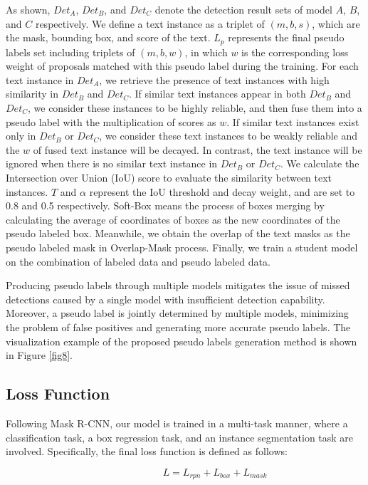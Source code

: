 As shown, $Det_{A}$, $Det_{B}$, and $Det_{C}$ denote the detection result sets of model $A$, $B$, and $C$ respectively. We define a text instance as a triplet of $(m,b,s)$, which are the mask, bounding box, and score of the text. $L_{p}$ represents the final pseudo labels set including triplets of $(m,b,w)$, in which $w$ is the corresponding loss weight of proposals matched with this pseudo label during the training. For each text instance in $Det_{A}$, we retrieve the presence of text instances with high similarity in $Det_{B}$ and $Det_{C}$. If similar text instances appear in both $Det_{B}$ and $Det_{C}$, we consider these instances to be highly reliable, and then fuse them into a pseudo label with the multiplication of scores as $w$. If similar text instances exist only in $Det_{B}$ or $Det_{C}$, we consider these text instances to be weakly reliable and the $w$ of fused text instance will be decayed. In contrast, the text instance will be ignored when there is no similar text instance in $Det_{B}$ or $Det_{C}$. We calculate the Intersection over Union (IoU) score to evaluate the similarity between text instances. $T$ and $\alpha$ represent the IoU threshold and decay weight, and are set to 0.8 and 0.5 respectively. Soft-Box means the process of boxes merging by calculating the average of coordinates of boxes as the new coordinates of the pseudo labeled box. Meanwhile, we obtain the overlap of the text masks as the pseudo labeled mask in Overlap-Mask process. Finally, we train a student model on the combination of labeled data and pseudo labeled data.

Producing pseudo labels through multiple models mitigates the issue of missed detections caused by a single model with insufficient detection capability. Moreover, a pseudo label is jointly determined by multiple models, minimizing the problem of false positives and generating more accurate pseudo labels. The visualization example of the proposed pseudo labels generation method is shown in Figure \ref{fig8}.


\subsection{Loss Function}
Following Mask R-CNN, our model is trained in a multi-task manner, where a classification task, a box regression task, and an instance segmentation task are involved. Specifically, the final loss function is defined as follows:

\begin{equation}
\label{loss}
\quad\quad\quad\quad\quad\quad \textit{L} = \textit{L}_{\textit{rpn}} + \textit{L}_{\textit{box}} + \textit{L}_{\textit{mask}}
\end{equation}  


